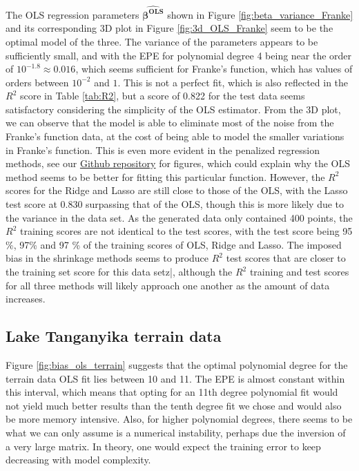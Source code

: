 \documentclass[a4paper, 10pt]{article}
\begin{document}
\begin{multicols}{2}
The OLS regression parameters $\bm{\hat{\beta ^\text{OLS}}}$ shown in Figure \ref{fig:beta_variance_Franke} and its  corresponding 3D plot in Figure \ref{fig:3d_OLS_Franke} seem to be the optimal model of the three. The variance of the parameters appears to be sufficiently small, and with the EPE for polynomial degree 4 being near the order of $10^{-1.8}\approx 0.016$, which seems sufficient for Franke's function, which has values of orders between  $10^{{-2}}$ and $1$.  This is not a perfect fit, which is also reflected in the $R^2$ score in Table \ref{tab:R2}, but a score of 0.822 for the test data seems satisfactory considering the simplicity of the OLS estimator. From the 3D plot, we can observe that the model is able to eliminate most of the noise from the Franke's function data, at the cost of being able to model the smaller variations in Franke's function. This is even more evident in the penalized regression methods, see our \href{https://github.com/bernharl/FYS-STK4155-project1}{Github repository} for figures, which could explain why the OLS method seems to be better for fitting this particular function. However, the $R^2$ scores for the Ridge and Lasso are still close to those of the OLS, with the Lasso test score at 0.830 surpassing that of the OLS, though this is more likely due to the variance in the data set. As the generated data only contained 400 points, the $R^2$ training scores are not identical to the test scores,  with the test score being 95 \%, 97\% and 97 \% of the training scores of OLS, Ridge and Lasso. The imposed bias in the shrinkage methods seems to produce $R^2$ test scores that are closer to the training set score for this data setz|,  although the $R^2$ training and test scores for all three methods will likely approach one another as the amount of data increases.



\subsection{Lake Tanganyika terrain data}
Figure \ref{fig:bias_ols_terrain} suggests that the optimal polynomial degree for the terrain data OLS fit lies between 10 and 11.  The EPE is almost constant within this interval, which means that opting for an 11th degree polynomial fit would not yield much better results than the tenth degree fit we chose and would also be more memory intensive. Also, for higher polynomial degrees, there seems to be what we can only assume is a numerical instability, perhaps due the inversion of a very large matrix. In theory, one would expect the training error to keep decreasing with model complexity.


\end{multicols}
\end{document}

